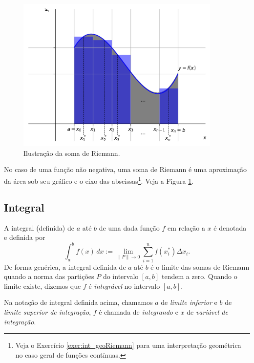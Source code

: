 \begin{figure}[H]
  \centering
  \includegraphics[width=0.9\textwidth]{./cap_int/dados/fig_soma_de_Riemann/fig_soma_de_Riemann}
  \caption{Ilustração da soma de Riemann.}
  \label{fig:soma_de_Riemann}
\end{figure}

\begin{obs}
No caso de uma função não negativa, uma soma de Riemann é uma aproximação da área sob seu gráfico e o eixo das abscissas\footnote{Veja o Exercício \ref{exer:int_geoRiemann} para uma interpretação geométrica no caso geral de funções contínuas.}. Veja a Figura \ref{fig:soma_de_Riemann}.
\end{obs}

\subsection{Integral}

A integral (definida) de $a$ até $b$ de uma dada função $f$ em relação a $x$ é denotada e definida por
\begin{equation}
  \int_a^b f(x)\,dx := \lim_{\|P\|\to 0} \sum_{i=1}^n f(x_i^*)\Delta x_i.
\end{equation}
De forma genérica, a integral definida de $a$ até $b$ é o limite das somas de Riemann quando a norma das partições $P$ do intervalo $[a, b]$ tendem a zero. Quando o limite existe, dizemos que $f$ é \emph{integrável} no intervalo $[a, b]$.

\begin{obs}
  Na notação de integral definida acima, chamamos $a$ de \emph{limite inferior} e $b$ de \emph{limite superior de integração}, $f$ é chamada de \emph{integrando} e $x$ de \emph{variável de integração}.
\end{obs}

